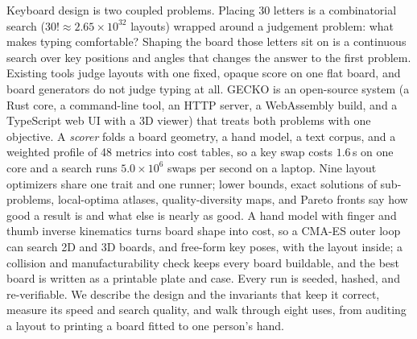 \documentclass{gecko-paper}
\begin{document}
\makepapertitle
\begin{paperabstract}
Keyboard design is two coupled problems. Placing 30 letters is a combinatorial search ($30!\approx 2.65\times10^{32}$ layouts) wrapped around a judgement problem: what makes typing comfortable? Shaping the board those letters sit on is a continuous search over key positions and angles that changes the answer to the first problem. Existing tools judge layouts with one fixed, opaque score on one flat board, and board generators do not judge typing at all. GECKO is an open-source system (a Rust core, a command-line tool, an HTTP server, a WebAssembly build, and a TypeScript web UI with a 3D viewer) that treats both problems with one objective. A \emph{scorer} folds a board geometry, a hand model, a text corpus, and a weighted profile of 48 metrics into cost tables, so a key swap costs $1.6$\,\textmu s on one core and a search runs $5.0\times10^{6}$ swaps per second on a laptop. Nine layout optimizers share one trait and one runner; lower bounds, exact solutions of sub-problems, local-optima atlases, quality-diversity maps, and Pareto fronts say how good a result is and what else is nearly as good. A hand model with finger and thumb inverse kinematics turns board shape into cost, so a CMA-ES outer loop can search 2D and 3D boards, and free-form key poses, with the layout inside; a collision and manufacturability check keeps every board buildable, and the best board is written as a printable plate and case. Every run is seeded, hashed, and re-verifiable. We describe the design and the invariants that keep it correct, measure its speed and search quality, and walk through eight uses, from auditing a layout to printing a board fitted to one person's hand.
\end{paperabstract}
\end{document}
